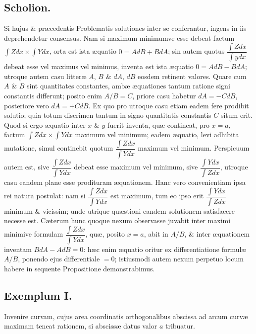 \subsection*{Scholion.}
Si hujus \& præcedentis Problematis solutiones inter se conferantur, ingens in iis deprehendetur consensus. Nam si maximum minimumve esse debeat factum $\int Zdx\times\int Ydx$, orta est ista æquatio $0=AdB+BdA$; sin autem quotus $\dfrac{\int Zdx}{\int ydx}$ debeat esse vel maximus vel minimus, inventa est ista æquatio $0=AdB-BdA$; utroque autem casu litteræ $A$, $B$ \& $dA$, $dB$ eosdem retinent valores. Quare cum $A$ \& $B$ sint quantitates constantes, ambæ æquationes tantum ratione signi constantis differunt; posito enim $A/B=C$, priore casu habetur $dA=-CdB$, posteriore vero $dA=+CdB$. Ex quo pro utroque casu etiam eadem fere prodibit solutio; quia totum discrimen tantum in signo quantitatis constantis $C$ situm erit. Quod si ergo æquatio inter $x$ \& $y$ fuerit inventa, quæ
contineat, pro $x=a$, factum $\int Zdx\times\int Ydx$ maximum vel minimum; eadem æquatio, levi adhibita mutatione, simul continebit quotum $\dfrac{\int Zdx}{\int Ydx}$ maximum vel minimum. Perspicuum autem est, sive $\dfrac{\int Zdx}{\int Ydx}$ debeat esse maximum vel minimum, sive $\dfrac{\int Ydx}{\int Zdx}$, utroque casu eandem plane esse prodituram æquationem. Hanc vero convenientiam ipsa rei natura postulat: nam si $\dfrac{\int Zdx}{\int Ydx}$ est maximum, tum eo ipso erit $\dfrac{\int Ydx}{\int Zdx}$ minimum \& vicissim; unde utrique quæstioni eandem solutionem satisfacere necesse est. Cæterum hunc quoque nexum observasse juvabit inter maximi minimive formulam $\dfrac{\int Zdx}{\int Ydx}$, quæ, posito $x=a$, abit in $A/B$, \& inter æquationem inventam $BdA-AdB=0$: hæc enim æquatio oritur ex differentiatione formulæ $A/B$, ponendo ejus differentiale $=0$; istiusmodi autem nexum perpetuo locum habere in sequente Propositione demonstrabimus.
\subsection*{Exemplum I.}
Invenire curvam, cujus area coordinatis orthogonalibus abscissa ad arcum curvæ maximam teneat rationem, si abscissæ datus valor $a$ tribuatur.

